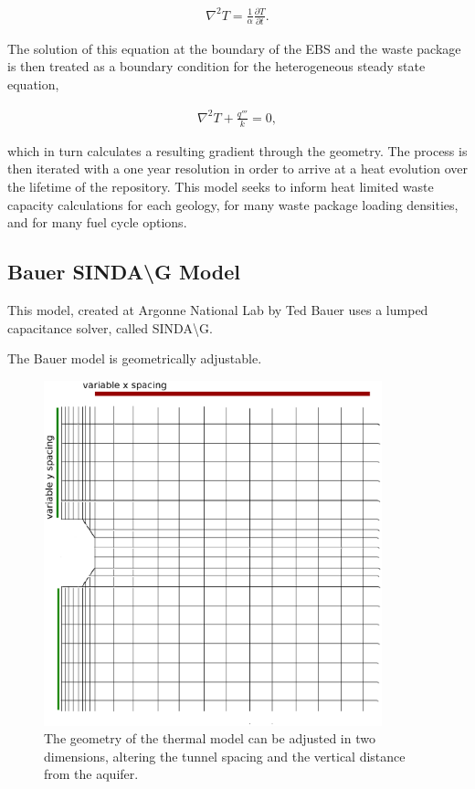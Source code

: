 {\begin{align}
  \nabla^2T  = \frac{1}{\alpha}\frac{\partial T}{\partial t}.
  \label{condGl}
\end{align}

The solution of this equation at the boundary of the EBS and the waste package 
is then treated as a boundary condition for the heterogeneous steady state 
equation, 

\begin{align}
  \nabla^2T + \frac{q'''}{k} = 0,
  \label{condGeneral}
\end{align}


which in turn calculates a resulting gradient through the geometry. The 
process is then iterated with a one year resolution in order to arrive at a heat 
evolution over  the lifetime of the repository. This model seeks to inform heat
limited waste capacity calculations for each geology, for many waste package 
loading densities, and for many fuel cycle options.  


\subsection{Bauer SINDA{\textbackslash}G Model}

This model, created at Argonne National Lab by Ted Bauer uses a lumped 
capacitance solver, called SINDA{\textbackslash}G.

The Bauer model is geometrically adjustable. 

\begin{figure}[htbp!]
  \begin{center}
    \includegraphics[height=10cm]{./chapters/current/sindageom.eps}
  \end{center}
  \caption{The geometry of the thermal model can be adjusted in two dimensions, 
  altering the tunnel spacing and the vertical distance from the aquifer.}
  \label{fig:sindageom}
\end{figure}

}

